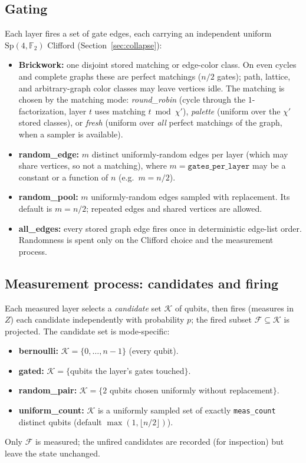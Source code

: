 \documentclass[11pt]{article}
\theoremstyle{definition}
\theoremstyle{plain}
\newcommand{\F}{\mathbb{F}}
\newcommand{\Sp}{\mathrm{Sp}}
\begin{document}
\subsection{Gating}
Each layer fires a set of gate edges, each carrying an independent uniform
$\Sp(4,\F_2)$ Clifford (Section~\ref{sec:collapse}):
\begin{itemize}[leftmargin=1.5em]
\item \textbf{Brickwork:} one disjoint stored matching or edge-color class. On
  even cycles and complete graphs these are perfect matchings ($n/2$ gates);
  path, lattice, and arbitrary-graph color classes may leave vertices idle. The
  matching is chosen by the matching mode:
  \emph{round\_robin} (cycle through the $1$-factorization, layer $t$ uses
  matching $t\bmod\chi'$), \emph{palette} (uniform over the $\chi'$ stored
  classes), or \emph{fresh} (uniform over \emph{all} perfect matchings of the
  graph, when a sampler is available).
\item \textbf{random\_edge:} $m$ distinct uniformly-random edges per layer (which
  may share vertices, so not a matching), where $m=\texttt{gates\_per\_layer}$ may
  be a constant or a function of $n$ (e.g.\ $m=n/2$).
\item \textbf{random\_pool:} $m$ uniformly-random edges sampled with replacement.
  Its default is $m=n/2$; repeated edges and shared vertices are allowed.
\item \textbf{all\_edges:} every stored graph edge fires once in deterministic
  edge-list order. Randomness is spent only on the Clifford choice and the
  measurement process.
\end{itemize}

\subsection{Measurement process: candidates and firing}
\label{sec:measmodes}
Each measured layer selects a \emph{candidate} set $\mathcal{K}$ of qubits, then
fires (measures in $Z$) each candidate independently with probability $p$; the
fired subset $\mathcal{F}\subseteq\mathcal{K}$ is projected. The candidate set is
mode-specific:
\begin{itemize}[leftmargin=1.5em]
\item \textbf{bernoulli:} $\mathcal{K}=\{0,\dots,n-1\}$ (every qubit).
\item \textbf{gated:} $\mathcal{K}=\{$qubits the layer's gates touched$\}$.
\item \textbf{random\_pair:} $\mathcal{K}=\{2$ qubits chosen uniformly without
  replacement$\}$.
\item \textbf{uniform\_count:} $\mathcal{K}$ is a uniformly sampled set of
  exactly \texttt{meas\_count} distinct qubits (default $\max(1,\lfloor n/2\rfloor)$).
\end{itemize}
Only $\mathcal{F}$ is measured; the unfired candidates are recorded (for
inspection) but leave the state unchanged.
\end{document}
